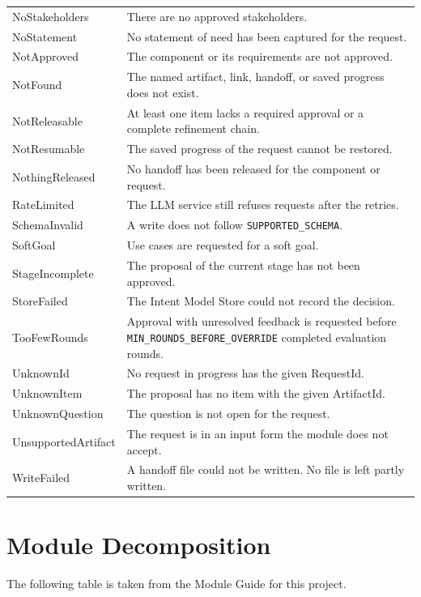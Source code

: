 \documentclass[12pt, titlepage]{article}
\begin{document}
{\begin{longtable}{l p{10.5cm}}
NoStakeholders & There are no approved stakeholders.\\
NoStatement & No statement of need has been captured for the request.\\
NotApproved & The component or its requirements are not approved.\\
NotFound & The named artifact, link, handoff, or saved progress does not exist.\\
NotReleasable & At least one item lacks a required approval or a complete refinement chain.\\
NotResumable & The saved progress of the request cannot be restored.\\
NothingReleased & No handoff has been released for the component or request.\\
RateLimited & The LLM service still refuses requests after the retries.\\
SchemaInvalid & A write does not follow \texttt{SUPPORTED\_SCHEMA}.\\
SoftGoal & Use cases are requested for a soft goal.\\
StageIncomplete & The proposal of the current stage has not been approved.\\
StoreFailed & The Intent Model Store could not record the decision.\\
TooFewRounds & Approval with unresolved feedback is requested before \texttt{MIN\_ROUNDS\_BEFORE\_OVERRIDE} completed evaluation rounds.\\
UnknownId & No request in progress has the given RequestId.\\
UnknownItem & The proposal has no item with the given ArtifactId.\\
UnknownQuestion & The question is not open for the request.\\
UnsupportedArtifact & The request is in an input form the module does not accept.\\
WriteFailed & A handoff file could not be written. No file is left partly written.\\
\bottomrule
\end{longtable}}

\section{Module Decomposition}

The following table is taken from the Module Guide for this project.
\end{document}
